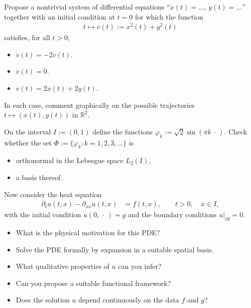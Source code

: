 \documentclass[12pt,a4paper]{article}
\newcounter{task}[section]
\newcommand{\newtask}{\refstepcounter{task}{{\ }\\\textbf{1.\thetask}}}
\begin{document}
    Propose a nontrivial system of differential equations
    ``$\dot{x}(t) = \ldots$,
    $\dot{y}(t) = \ldots$''
    together with an initial condition at $t = 0$
    for which the function
    \begin{align}
        t \mapsto v(t) := x^2(t) + y^2(t)
    \end{align}
    satisfies, for all $t > 0$,
    \begin{itemize}
    \item
        $\dot{v}(t) = -2 v(t)$.
    \item 
        $\dot{v}(t) = 0$.
    \item
        $\dot{v}(t) = 2 x(t) + 2 y(t)$.
    \end{itemize}
    In each case, 
    comment graphically on the possible trajectories $t \mapsto (x(t), y(t))$ in $\mathbb{R}^2$.

    

    \newtask %
    
    On the interval $I := (0, 1)$
    define
    the functions
    $
        \varphi_k := \sqrt{2} \sin(\pi k \,\cdot\,)
    $.
    Check whether the set
    $\Phi := \{ \varphi_k : k = 1, 2, 3, \ldots \}$
    is
    \begin{itemize}
    \item
        orthonormal
        in the Lebesgue space $L_2(I)$,
    \item
        a basis thereof.
    \end{itemize}

    Now consider the heat equation
    \begin{align}
        \partial_t u(t, x) - \partial_{x x} u(t, x)
        & =
        f(t, x),
        \qquad
        t > 0,
        \quad
        x \in I
        ,
    \end{align}
    with the initial condition $u(0, \,\cdot\,) = g$
    and the boundary conditions $u|_{\partial I} = 0$.
    
    \begin{itemize}
    \item
        What is the physical motivation for this PDE?
    \item
        Solve the PDE formally by expansion in a suitable spatial basis.
    \item
        What qualitative properties of $u$ can you infer?
    \item
        Can you propose a suitable functional framework?
    \item
        Does the solution $u$ depend continuously 
        on the data $f$ and $g$?
    \end{itemize}
\end{document}
